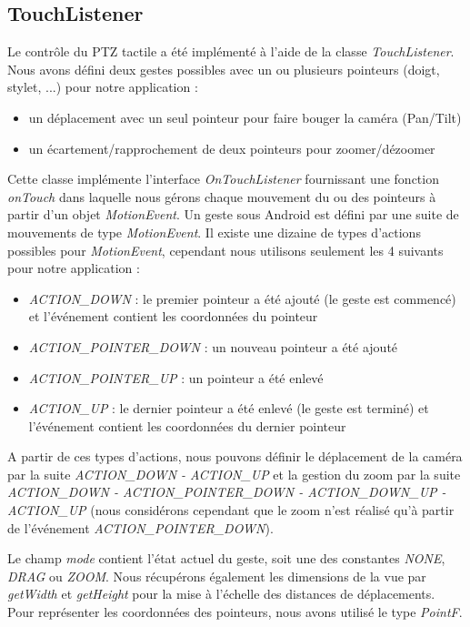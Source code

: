 \subsection{TouchListener}
Le contrôle du PTZ tactile a été implémenté à l'aide de la classe \textit{TouchListener}. Nous avons défini deux gestes possibles avec un ou plusieurs pointeurs (doigt, stylet, ...) pour notre application :
\begin{itemize}
\item un déplacement avec un seul pointeur pour faire bouger la caméra (Pan/Tilt)
\item un écartement/rapprochement de deux pointeurs pour zoomer/dézoomer
\end{itemize}
Cette classe implémente l'interface \textit{OnTouchListener} fournissant une fonction \textit{onTouch} dans laquelle nous gérons chaque mouvement du ou des pointeurs à partir d'un objet \textit{MotionEvent}. Un geste sous Android est défini par une suite de mouvements de type \textit{MotionEvent}.
Il existe une dizaine de types d'actions possibles pour \textit{MotionEvent}, cependant nous utilisons seulement les 4 suivants pour notre application :
\begin{itemize}
\item \textit{ACTION_DOWN} : le premier pointeur a été ajouté (le geste est commencé) et l'événement contient les coordonnées du pointeur
\item \textit{ACTION_POINTER_DOWN} : un nouveau pointeur a été ajouté
\item \textit{ACTION_POINTER_UP} : un pointeur a été enlevé
\item \textit{ACTION_UP} : le dernier pointeur a été enlevé (le geste est terminé) et l'événement contient les coordonnées du dernier pointeur
\end{itemize}
A partir de ces types d'actions, nous pouvons définir le déplacement de la caméra par la suite \textit{ACTION_DOWN - ACTION_UP} et la gestion du zoom par la suite
\textit{ACTION_DOWN - ACTION_POINTER_DOWN - ACTION_DOWN_UP - ACTION_UP} (nous considérons cependant que le zoom n'est réalisé qu'à partir de l'événement \textit{ACTION_POINTER_DOWN}).

Le champ \textit{mode} contient l'état actuel du geste, soit une des constantes \textit{NONE}, \textit{DRAG} ou \textit{ZOOM}.
Nous récupérons également les dimensions de la vue par \textit{getWidth} et \textit{getHeight} pour la mise à l'échelle des distances de déplacements. 
Pour représenter les coordonnées des pointeurs, nous avons utilisé le type \textit{PointF}.

